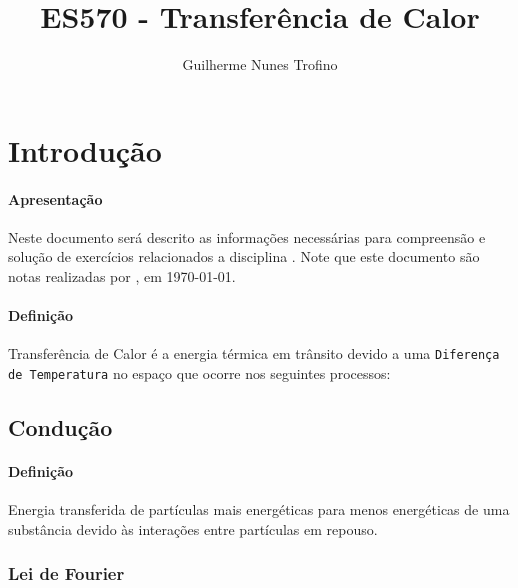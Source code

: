 \documentclass{article}
\title{ES570 - Transferência de Calor}
\author{Guilherme Nunes Trofino}
\begin{document}
    \maketitle
\newpage

    \tableofcontents
\newpage

    \section{Introdução}
        \paragraph{Apresentação}Neste documento será descrito as informações necessárias para compreensão e solução de exercícios relacionados a disciplina \thetitle. Note que este documento são notas realizadas por \theauthor, em \today.

        \paragraph{Definição}Transferência de Calor é a energia térmica em trânsito devido a uma \texttt{Diferença de Temperatura} no espaço que ocorre nos seguintes processos:

        \subsection{Condução}
            \paragraph{Definição}Energia transferida de partículas mais energéticas para menos energéticas de uma substância devido às interações entre partículas em repouso.

        \subsubsection{Lei de Fourier}
\end{document}
